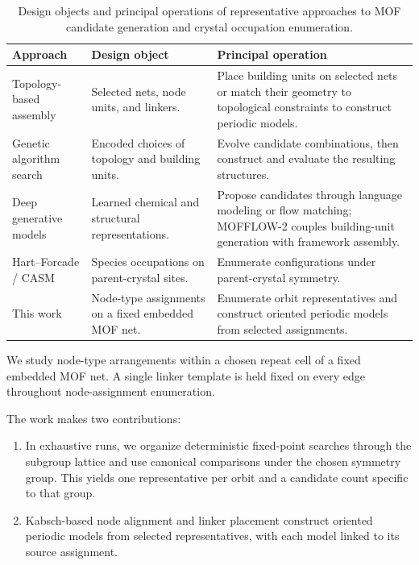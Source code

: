 \documentclass[a5paper, 10pt]{article}
\begin{document}
\begin{table}[htbp]
\centering
\small
\singlespacing
\setlength{\tabcolsep}{5pt}
\renewcommand{\arraystretch}{1.08}
\captionsetup{margin=0pt,skip=6pt}
\caption{Design objects and principal operations of representative approaches to MOF candidate generation and crystal occupation enumeration.}
\label{tab:related_capabilities}
\begin{tabular}{@{}
    >{\raggedright\arraybackslash}p{}
    >{\raggedright\arraybackslash}p{}
    >{\raggedright\arraybackslash}p{}@{}}
\toprule
\textbf{Approach} & \textbf{Design object} & \textbf{Principal operation} \\
\midrule
Topology-based assembly & Selected nets, node units, and linkers. & Place building units on selected nets or match their geometry to topological constraints to construct periodic models. \\
\addlinespace[4pt]
Genetic algorithm search & Encoded choices of topology and building units. & Evolve candidate combinations, then construct and evaluate the resulting structures. \\
\addlinespace[4pt]
Deep generative models & Learned chemical and structural representations. & Propose candidates through language modeling or flow matching; MOFFLOW-2 couples building-unit generation with framework assembly. \\
\addlinespace[4pt]
Hart--Forcade / CASM & Species occupations on parent-crystal sites. & Enumerate configurations under parent-crystal symmetry. \\
\addlinespace[4pt]
This work & Node-type assignments on a fixed embedded MOF net. & Enumerate orbit representatives and construct oriented periodic models from selected assignments. \\
\bottomrule
\end{tabular}

\end{table}

We study node-type arrangements within a chosen repeat cell of a fixed embedded MOF net. A single linker template is held fixed on every edge throughout node-assignment enumeration.

The work makes two contributions:%
\begin{enumerate}
    \item In exhaustive runs, we organize deterministic fixed-point searches through the subgroup lattice and use canonical comparisons under the chosen symmetry group. This yields one representative per orbit and a candidate count specific to that group.
    \item Kabsch-based node alignment and linker placement construct oriented periodic models from selected representatives, with each model linked to its source assignment.
\end{enumerate}
\end{document}
